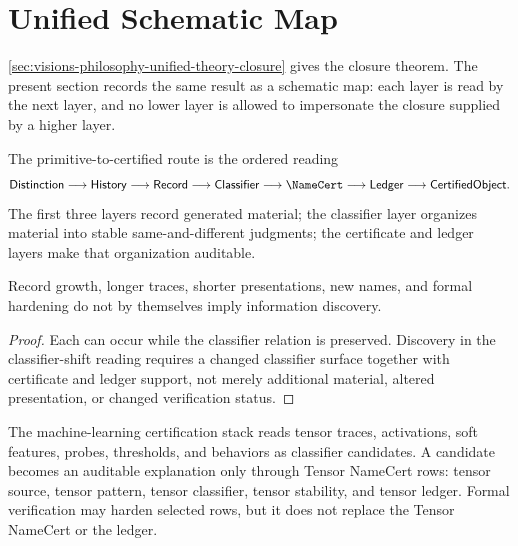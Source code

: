\section{Unified Schematic Map}
\label{sec:visions-philosophy-unified-schematic-map}

\autoref{sec:visions-philosophy-unified-theory-closure} gives the
closure theorem. The present section records the same result as a
schematic map: each layer is read by the next layer, and no lower layer
is allowed to impersonate the closure supplied by a higher layer.

\begin{definition}
\label{def:philosophy-primitive-certified-route}
The primitive-to-certified route is the ordered reading
$$
\mathsf{Distinction}
\longrightarrow
\mathsf{History}
\longrightarrow
\mathsf{Record}
\longrightarrow
\mathsf{Classifier}
\longrightarrow
\NameCert
\longrightarrow
\mathsf{Ledger}
\longrightarrow
\mathsf{CertifiedObject}.
$$
The first three layers record generated material; the classifier layer
organizes material into stable same-and-different judgments; the
certificate and ledger layers make that organization auditable.
\end{definition}


\begin{theorem}
\label{thm:philosophy-record-growth-below-classifier-discovery}
Record growth, longer traces, shorter presentations, new names, and
formal hardening do not by themselves imply information discovery.
\end{theorem}
\begin{proof}
Each can occur while the classifier relation is preserved. Discovery in
the classifier-shift reading requires a changed classifier surface
together with certificate and ledger support, not merely additional
material, altered presentation, or changed verification status.
\end{proof}

\begin{definition}
\label{def:philosophy-machine-learning-certification-stack}
The machine-learning certification stack reads tensor traces,
activations, soft features, probes, thresholds, and behaviors as
classifier candidates. A candidate becomes an auditable explanation only
through Tensor NameCert rows: tensor source, tensor pattern, tensor
classifier, tensor stability, and tensor ledger. Formal verification
may harden selected rows, but it does not replace the Tensor NameCert or
the ledger.
\end{definition}

